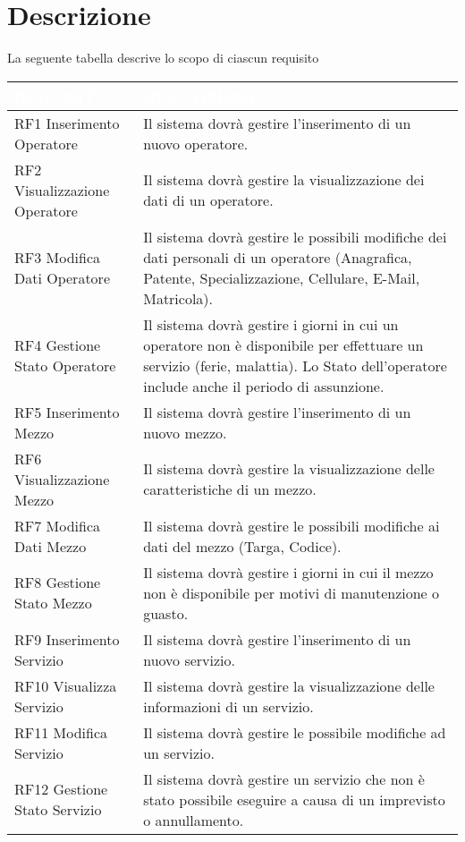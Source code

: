 \documentclass[green, fancy, 11pt]{elegantbook}
\begin{document}
\section{Descrizione}
La seguente tabella descrive lo scopo di ciascun requisito
{
\begin{table}[H]
	\small
	\centering
\begin{tabular}{|p{5cm}|p{11cm}|}
	\hline
	\rowcolor{DarkGreen}
	\textcolor{white}{REQUISITO} & \textcolor{white}{DESCRIZIONE}\\
	\hline
	RF1 Inserimento Operatore & Il sistema dovrà gestire l'inserimento di un nuovo operatore.\\
	\hline
	RF2 Visualizzazione Operatore & Il sistema dovrà gestire la visualizzazione dei dati di un operatore.\\
	\hline
	RF3 Modifica Dati Operatore & Il sistema dovrà gestire le possibili modifiche dei dati personali di un operatore (Anagrafica, Patente, Specializzazione, Cellulare, E-Mail, Matricola).\\
	\hline
	RF4 Gestione Stato Operatore & Il sistema dovrà gestire i giorni in cui un operatore non è disponibile per effettuare un servizio (ferie, malattia). Lo Stato dell'operatore include anche il periodo di assunzione.\\
	\hline
	RF5 Inserimento Mezzo & Il sistema dovrà gestire l'inserimento di un nuovo mezzo.\\
	\hline
	RF6 Visualizzazione Mezzo & Il sistema dovrà gestire la visualizzazione delle caratteristiche di un mezzo.\\
	\hline
	RF7 Modifica Dati Mezzo & Il sistema dovrà gestire le possibili modifiche ai dati del mezzo (Targa, Codice).\\
	\hline
	RF8 Gestione Stato Mezzo & Il sistema dovrà gestire i giorni in cui il mezzo non è disponibile per motivi di manutenzione o guasto.\\
	\hline
	RF9 Inserimento Servizio & Il sistema dovrà gestire l'inserimento di un nuovo servizio.\\
	\hline
	RF10 Visualizza Servizio & Il sistema dovrà gestire la visualizzazione delle informazioni di un servizio.\\
	\hline
	RF11 Modifica Servizio & Il sistema dovrà gestire le possibile modifiche ad un servizio.\\
	\hline
	RF12 Gestione Stato Servizio & Il sistema dovrà gestire un servizio che non è stato possibile eseguire a causa di un imprevisto o annullamento.\\

\end{tabular}
\end{table}}
\end{document}
